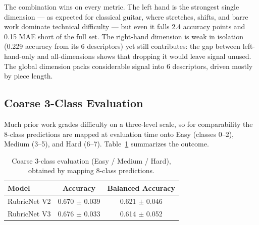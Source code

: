 \begin{table}[htbp]
\centering
\caption{Per-dimension ablation with Random Forest on V3 descriptors (mean $\pm$ std over 5 folds).}
\label{tab:dimension_ablation}
\end{table}

The combination wins on every metric. The left hand is the strongest single dimension --- as expected for classical guitar, where stretches, shifts, and barre work dominate technical difficulty --- but even it falls 2.4 accuracy points and 0.15 MAE short of the full set. The right-hand dimension is weak in isolation (0.229 accuracy from its 6 descriptors) yet still contributes: the gap between left-hand-only and all-dimensions shows that dropping it would leave signal unused. The global dimension packs considerable signal into 6 descriptors, driven mostly by piece length.

\subsection{Coarse 3-Class Evaluation}
\label{sec:coarse}
Much prior work grades difficulty on a three-level scale, so for comparability the 8-class predictions are mapped at evaluation time onto Easy (classes 0--2), Medium (3--5), and Hard (6--7). Table~\ref{tab:3class_results} summarizes the outcome.

\begin{table}[htbp]
\centering
\caption{Coarse 3-class evaluation (Easy / Medium / Hard), obtained by mapping 8-class predictions.}
\label{tab:3class_results}
\begin{tabular}{lcc}
\toprule
\textbf{Model} & \textbf{Accuracy} & \textbf{Balanced Accuracy} \\
\midrule
RubricNet V2 & 0.670 $\pm$ 0.039 & 0.621 $\pm$ 0.046 \\
RubricNet V3 & 0.676 $\pm$ 0.033 & 0.614 $\pm$ 0.052 \\
\bottomrule
\end{tabular}
\end{table}

